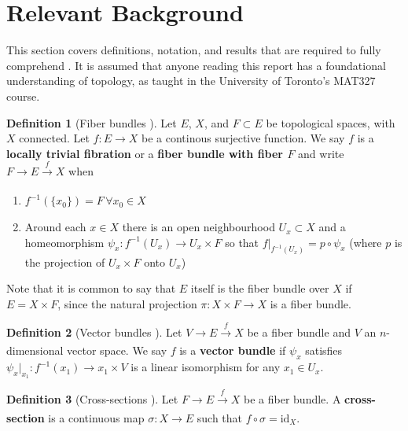 \documentclass[12pt]{article}
\theoremstyle{definition}
\newtheorem{defn}{Definition}
\begin{document}
\section{Relevant Background}
This section covers definitions, notation, and results that are required to
fully comprehend \cite{topology-robot-arm}. It is assumed that anyone reading
this report has a foundational understanding of topology, as taught 
in the University of Toronto's MAT327 course.

\begin{defn}[Fiber bundles \cite{topology-fiber-bundles}]
    Let \(E\), \(X\), and \(F \subset E\) be topological spaces, 
    with \(X\) connected.
    Let \(f : E \rightarrow X\) be a continous surjective function. 
    We say \(f\) is a \textbf{locally trivial fibration} or a 
    \textbf{fiber bundle with fiber \(F\)} and write 
    \(F \rightarrow E \xrightarrow[]{f} X\) when
    \begin{enumerate}
        \item \(f^{-1}(\{x_0\}) = F \, \forall x_0 \in X\)
        \item Around each \(x \in X\) there is an open neighbourhood 
            \(U_x \subset X\) and a homeomorphism
            \(\psi_x : f^{-1}(U_x) \rightarrow U_x \times F\) so that
            \(f\vert_{f^{-1}(U_x)} = p \circ \psi_x\) (where \(p\)
            is the projection of \(U_x \times F\) onto \(U_x\))
    \end{enumerate}
    Note that it is common to say that \(E\) itself is the fiber bundle over
    \(X\) if \(E = X \times F\), since the natural projection 
    \(\pi : X \times F \rightarrow X\) is a fiber bundle.
\end{defn}

\begin{defn}[Vector bundles \cite{topology-fiber-bundles}]
    Let \(V \rightarrow E \xrightarrow[]{f} X\) be a fiber bundle and \(V\) an
    \(n\)-dimensional vector space. We say \(f\) is a
    \textbf{vector bundle} if \(\psi_x\) satisfies
    \(\psi_x \vert_{x_1} : f^{-1}(x_1) \rightarrow {x_1}\times V\) is a linear
    isomorphism for any \(x_1 \in U_x\).
\end{defn}

\begin{defn}[Cross-sections \cite{topology-fiber-bundles}]
    Let \(F \rightarrow E \xrightarrow[]{f} X\) be a fiber bundle.
    A \textbf{cross-section} is a continuous map \(\sigma : X \rightarrow E\)
    such that \(f \circ \sigma = \text{id}_X\).
\end{defn}
\end{document}

